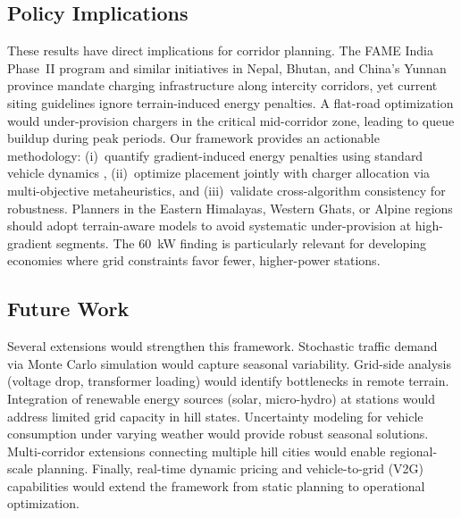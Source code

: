 \documentclass[conference]{IEEEtran}
\begin{document}
\subsection{Policy Implications}

These results have direct implications for corridor planning. The FAME India Phase~II program \cite{6} and similar initiatives in Nepal, Bhutan, and China's Yunnan province mandate charging infrastructure along intercity corridors, yet current siting guidelines ignore terrain-induced energy penalties. A flat-road optimization would under-provision chargers in the critical mid-corridor zone, leading to queue buildup during peak periods. Our framework provides an actionable methodology: (i)~quantify gradient-induced energy penalties using standard vehicle dynamics \cite{10}, (ii)~optimize placement jointly with charger allocation via multi-objective metaheuristics, and (iii)~validate cross-algorithm consistency for robustness. Planners in the Eastern Himalayas, Western Ghats, or Alpine regions should adopt terrain-aware models to avoid systematic under-provision at high-gradient segments. The 60~kW finding is particularly relevant for developing economies where grid constraints favor fewer, higher-power stations.

\subsection{Future Work}

Several extensions would strengthen this framework. Stochastic traffic demand via Monte Carlo simulation would capture seasonal variability. Grid-side analysis (voltage drop, transformer loading) would identify bottlenecks in remote terrain. Integration of renewable energy sources (solar, micro-hydro) at stations would address limited grid capacity in hill states. Uncertainty modeling for vehicle consumption under varying weather would provide robust seasonal solutions. Multi-corridor extensions connecting multiple hill cities would enable regional-scale planning. Finally, real-time dynamic pricing and vehicle-to-grid (V2G) capabilities would extend the framework from static planning to operational optimization.

\balance
\end{document}
